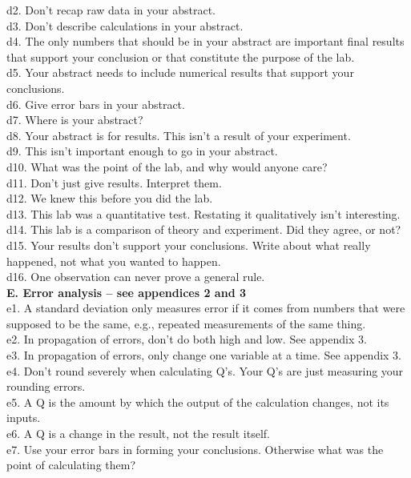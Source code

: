 \begin{multicols}{2}[]
d2. Don't recap raw data in your abstract.\\
d3. Don't describe calculations in your abstract.\\
d4. The only numbers that should be in your abstract are important final results that support your conclusion or that constitute the purpose of the lab.\\
d5. Your abstract needs to include numerical results that support your conclusions.\\
d6. Give error bars in your abstract.\\
d7. Where is your abstract?\\
d8. Your abstract is for results. This isn't a result of your experiment.\\
d9. This isn't important enough to go in your abstract.\\
d10. What was the point of the lab, and why would anyone care?\\
d11. Don't just give results. Interpret them.\\
d12. We knew this before you did the lab.\\
d13. This lab was a quantitative test. Restating it qualitatively isn't interesting.\\
d14. This lab is a comparison of theory and experiment. Did they agree, or not?\\
d15. Your results don't support your conclusions. Write about what really happened, not what you wanted to happen.\\
d16. One observation can never prove a general rule.\\
\textbf{E. Error analysis -- see appendices 2 and 3}\\
e1. A standard deviation only measures error if it comes from numbers that were supposed to be the same, e.g., repeated measurements of the same thing.\\
e2. In propagation of errors, don't do both high and low. See appendix 3.\\
e3. In propagation of errors, only change one variable at a time. See appendix 3.\\
e4. Don't round severely when calculating Q's. Your Q's are just measuring your rounding errors.\\
e5. A Q is the amount by which the output of the calculation changes, not its inputs.\\
e6. A Q is a change in the result, not the result itself.\\
e7. Use your error bars in forming your conclusions. Otherwise what was the point of calculating them?\\

\end{multicols}
